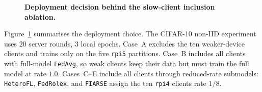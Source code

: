 \begin{figure}[!htbp]
\caption{\textbf{Deployment decision behind the slow-client inclusion ablation.}}
\label{fig:compute_slow_majority_scenario}
\end{figure}

Figure~\ref{fig:compute_slow_majority_scenario} summarises the deployment choice. The CIFAR-10 non-IID experiment uses \(20\) server rounds, \(3\) local epochs. Case~A excludes the ten weaker-device clients and trains only on the five \texttt{rpi5} partitions. Case~B includes all clients with full-model \texttt{FedAvg}, so weak clients keep their data but must train the full model at rate \(1.0\). Cases~C--E include all clients through reduced-rate submodels: \texttt{HeteroFL}, \texttt{FedRolex}, and \texttt{FIARSE} assign the ten \texttt{rpi4} clients rate \(1/8\).


